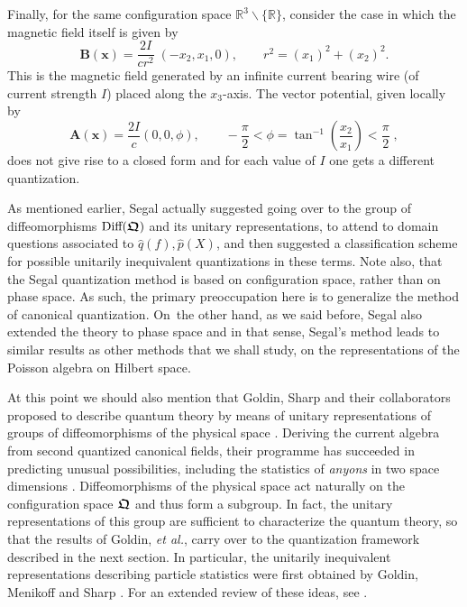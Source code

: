 \documentclass[11pt]{amsart}
\numberwithin{equation}{section}
\theoremstyle{remark}
\newcommand{\bfrakQ}{\mbox{\boldmath $\mathfrak Q$}}
\newcommand{\bA}{\mathbf A}
\newcommand{\bB}{\mathbf B}
\newcommand{\bx}{\mathbf x}
\begin{document}
Finally, for the same configuration space
${\mathbb R}^3\backslash\{\mathbb R\}$,
consider the case in which the magnetic field itself is given by
$$ \bB (\bx )  = \frac {2I}{c r^2}\; ( -x_2 , x_1 , 0 ) , \qquad   r^2 =
               (x_1)^2 +  (x_2)^2 . $$
This is the magnetic field generated by an infinite current bearing wire
(of current strength  $I$)
placed along the $x_3$-axis.  The vector potential, given locally by
$$
  \bA (\bx ) = \frac {2I}c (0, 0, \phi ) , \qquad
  -\frac {\pi}2 <  \phi = \tan^{-1} \left(\frac {x_2}{x_1}\right)
       < \frac {\pi}2 \; , $$
does not give rise to a closed form  and for each value of $I$ one gets a
different quantization.


\bigskip

As mentioned earlier, Segal actually suggested going over to the group of
diffeomorphisms $\mbox{\rm Diff} (\bfrakQ )$ and its unitary representations,
to attend to domain questions associated to $\widehat{q}(f), \widehat{p}(X)$,
and then suggested a classification scheme for possible unitarily inequivalent
quantizations in these terms. Note also, that the Segal quantization method is
based on configuration space, rather than on phase space. As such, the primary
preoccupation here is to generalize the method of canonical quantization.
On~the other hand, as we said before, Segal also extended the theory to phase
space and in that sense, Segal's method leads to similar results as other
methods that we shall study, on the representations of the Poisson algebra
on Hilbert space.

  At this point we should also mention that Goldin, Sharp and their collaborators
proposed to describe quantum theory by means of unitary representations of groups of
diffeomorphisms of the physical space \cite{bib:gol1,bib:GGPS,bib:GolSh1}.
Deriving the current algebra from second quantized canonical fields, their programme
has succeeded in predicting unusual possibilities, including the statistics
of {\em anyons} in two space dimensions \cite{bib:GoMeSh,bib:-golmensh1,bib:GoSh2,bib:LeiMyr}.
Diffeomorphisms of the physical space act naturally on the configuration space
$\bfrakQ$ and thus form a subgroup. In fact, the unitary representations of this group
are sufficient to characterize the quantum theory, so that the results of Goldin,
{\em et al.\/}, carry over to the quantization framework described in the next section.
In particular, the unitarily inequivalent representations describing particle
statistics were first obtained by Goldin, Menikoff and Sharp
\cite{bib:GoMeSh2,bib:GoMeSh,bib:-golmensh1}. For an extended review of these ideas,
see \cite{bib:gol2}.
\end{document}

